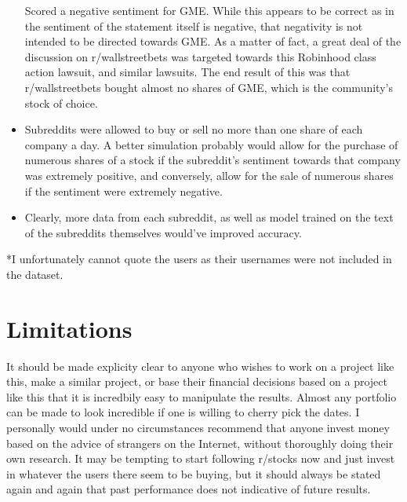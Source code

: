 \documentclass[11pt]{article}
\begin{document}
\begin{itemize}
	    Scored a negative sentiment for GME. While this appears to be
	    correct as in the sentiment of the statement itself is negative,
	    that negativity is not intended to be directed towards GME. As a
	    matter of fact, a great deal of the discussion on r/wallstreetbets
	    was targeted towards this Robinhood class action lawsuit, and
	    similar lawsuits. The end result of this was that r/wallstreetbets
	    bought almost no shares of GME, which is the community's stock of
	    choice.
	\item Subreddits were allowed to buy or sell no more than one share of
	    each company a day. A better simulation probably would allow for
	    the purchase of numerous shares of a stock if the subreddit's
	    sentiment towards that company was extremely positive, and
	    conversely, allow for the sale of numerous shares if the sentiment
	    were extremely negative.
	\item Clearly, more data from each subreddit, as well as model trained
	    on the text of the subreddits themselves would've improved
	    accuracy.
	\end{itemize}

	*I unfortunately cannot quote the users as their
	usernames were not included in the dataset.
\section{Limitations}
    It should be made explicity clear to anyone who wishes to work on a
    project like this, make a similar project, or base their financial
    decisions based on a project like this that it is incredbily easy to
    manipulate the results. Almost any portfolio can be made to look
    incredible if one is willing to cherry pick the dates. I personally would
    under no circumstances recommend that anyone invest money based on the
    advice of strangers on the Internet, without thoroughly doing their own
    research. It may be tempting to start following r/stocks now and just
    invest in whatever the users there seem to be buying, but it should
    always be stated again and again that past performance does not indicative
    of future results.
\end{document}
